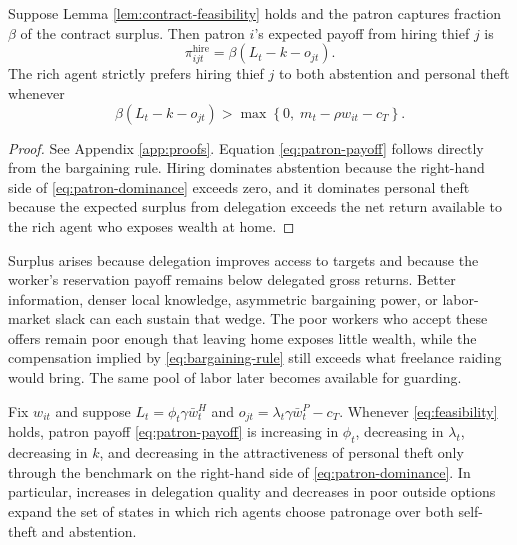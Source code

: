 \begin{proposition}
\label{prop:patronage}
Suppose Lemma \ref{lem:contract-feasibility} holds and the patron captures fraction $\beta$ of the contract surplus. Then patron $i$'s expected payoff from hiring thief $j$ is
\begin{equation}
\pi^{\mathrm{hire}}_{ijt} = \beta\left(L_t - k - o_{jt}\right).
\label{eq:patron-payoff}
\end{equation}
The rich agent strictly prefers hiring thief $j$ to both abstention and personal theft whenever
\begin{equation}
\beta\left(L_t - k - o_{jt}\right) > \max\left\{0,\; m_t - \rho w_{it} - c_T\right\}.
\label{eq:patron-dominance}
\end{equation}
\end{proposition}

\begin{proof}
See Appendix \ref{app:proofs}. Equation \eqref{eq:patron-payoff} follows directly from the bargaining rule. Hiring dominates abstention because the right-hand side of \eqref{eq:patron-dominance} exceeds zero, and it dominates personal theft because the expected surplus from delegation exceeds the net return available to the rich agent who exposes wealth at home.
\end{proof}

Surplus arises because delegation improves access to targets and because the worker's reservation payoff remains below delegated gross returns. Better information, denser local knowledge, asymmetric bargaining power, or labor-market slack can each sustain that wedge. The poor workers who accept these offers remain poor enough that leaving home exposes little wealth, while the compensation implied by \eqref{eq:bargaining-rule} still exceeds what freelance raiding would bring. The same pool of labor later becomes available for guarding.

\begin{corollary}
\label{cor:patronage-statics}
Fix $w_{it}$ and suppose $L_t = \phi_t \gamma \bar{w}^{H}_t$ and $o_{jt} = \lambda_t \gamma \bar{w}^{P}_t - c_T$. Whenever \eqref{eq:feasibility} holds, patron payoff \eqref{eq:patron-payoff} is increasing in $\phi_t$, decreasing in $\lambda_t$, decreasing in $k$, and decreasing in the attractiveness of personal theft only through the benchmark on the right-hand side of \eqref{eq:patron-dominance}. In particular, increases in delegation quality and decreases in poor outside options expand the set of states in which rich agents choose patronage over both self-theft and abstention.
\end{corollary}

